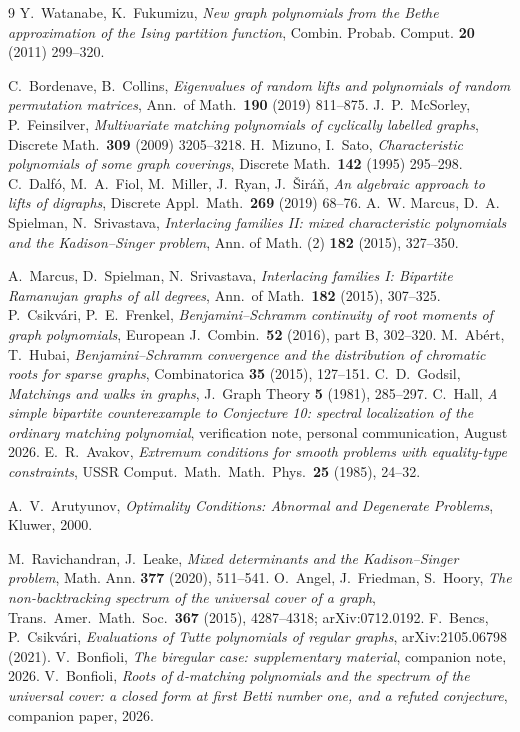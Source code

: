 \documentclass[11pt]{article}
\theoremstyle{remark}
\begin{document}
\begin{thebibliography}{9}
 Y.~Watanabe, K.~Fukumizu, \emph{New graph polynomials from the Bethe
approximation of the Ising partition function}, Combin. Probab. Comput.
\textbf{20} (2011) 299--320.

 C.~Bordenave, B.~Collins, \emph{Eigenvalues of random lifts and
polynomials of random permutation matrices}, Ann.\ of Math.\ \textbf{190}
(2019) 811--875.
 J.~P.~McSorley, P.~Feinsilver, \emph{Multivariate matching
polynomials of cyclically labelled graphs}, Discrete Math.\ \textbf{309} (2009)
3205--3218.
 H.~Mizuno, I.~Sato, \emph{Characteristic polynomials of some graph
coverings}, Discrete Math.\ \textbf{142} (1995) 295--298.
 C.~Dalf\'o, M.~A.~Fiol, M.~Miller, J.~Ryan, J.~\v{S}ir\'a\v{n},
\emph{An algebraic approach to lifts of digraphs}, Discrete Appl.\ Math.\
\textbf{269} (2019) 68--76.
 A.~W. Marcus, D.~A. Spielman, N.~Srivastava,
\emph{Interlacing families II: mixed characteristic polynomials and the Kadison--Singer
problem}, Ann. of Math. (2) \textbf{182} (2015), 327--350.

 A.~Marcus, D.~Spielman, N.~Srivastava, \emph{Interlacing
families I: Bipartite Ramanujan graphs of all degrees}, Ann.\ of Math.\
\textbf{182} (2015), 307--325.
\bibitem{CsF} P.~Csikv\'ari, P.~E.~Frenkel, \emph{Benjamini--Schramm continuity
of root moments of graph polynomials}, European J.\ Combin.\ \textbf{52} (2016),
part B, 302--320.
\bibitem{AH} M.~Ab\'ert, T.~Hubai, \emph{Benjamini--Schramm convergence and the
distribution of chromatic roots for sparse graphs}, Combinatorica \textbf{35}
(2015), 127--151.
\bibitem{Go} C.~D.~Godsil, \emph{Matchings and walks in graphs}, J.\ Graph
Theory \textbf{5} (1981), 285--297.
\bibitem{HallCE} C.~Hall, \emph{A simple bipartite counterexample to Conjecture 10:
  spectral localization of the ordinary matching polynomial}, verification note, personal
  communication, August 2026.
\bibitem{Avakov} E.~R.~Avakov, \emph{Extremum conditions for smooth problems with
equality-type constraints}, USSR Comput.\ Math.\ Math.\ Phys.\ \textbf{25} (1985), 24--32.

\bibitem{Arutyunov} A.~V.~Arutyunov, \emph{Optimality Conditions: Abnormal and Degenerate
Problems}, Kluwer, 2000.

 M.~Ravichandran, J.~Leake, \emph{Mixed determinants and the Kadison--Singer
  problem}, Math. Ann. \textbf{377} (2020), 511--541.
\bibitem{AFH} O.~Angel, J.~Friedman, S.~Hoory, \emph{The non-backtracking spectrum of the
  universal cover of a graph}, Trans.\ Amer.\ Math.\ Soc.\ \textbf{367} (2015), 4287--4318;
  arXiv:0712.0192.
\bibitem{BCs} F.~Bencs, P.~Csikv\'ari, \emph{Evaluations of Tutte polynomials of
regular graphs}, arXiv:2105.06798 (2021).
\bibitem{Supp2} V.~Bonfioli, \emph{The biregular case: supplementary material},
  companion note, 2026.
\bibitem{PartI} V.~Bonfioli, \emph{Roots of $d$-matching polynomials and the spectrum of
  the universal cover: a closed form at first Betti number one, and a refuted conjecture},
  companion paper, 2026.
\end{thebibliography}
\end{document}
